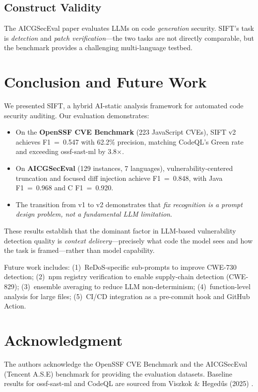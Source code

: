 \documentclass[conference]{IEEEtran}
\begin{document}
\subsection{Construct Validity}
The AICGSecEval paper evaluates LLMs on code \textit{generation} security. SIFT's task is \textit{detection} and \textit{patch verification}---the two tasks are not directly comparable, but the benchmark provides a challenging multi-language testbed.

\section{Conclusion and Future Work}

We presented SIFT, a hybrid AI-static analysis framework for automated code security auditing. Our evaluation demonstrates:

\begin{itemize}
\item On the \textbf{OpenSSF CVE Benchmark} (223 JavaScript CVEs), SIFT v2 achieves F1~=~0.547 with 62.2\% precision, matching CodeQL's Green rate and exceeding ossf-sast-ml by 3.8$\times$.
\item On \textbf{AICGSecEval} (129 instances, 7 languages), vulnerability-centered truncation and focused diff injection achieve F1~=~0.848, with Java F1~=~0.968 and C F1~=~0.920.
\item The transition from v1 to v2 demonstrates that \textit{fix recognition is a prompt design problem, not a fundamental LLM limitation}.
\end{itemize}

These results establish that the dominant factor in LLM-based vulnerability detection quality is \textit{context delivery}---precisely what code the model sees and how the task is framed---rather than model capability.

Future work includes: (1)~ReDoS-specific sub-prompts to improve CWE-730 detection; (2)~npm registry verification to enable supply-chain detection (CWE-829); (3)~ensemble averaging to reduce LLM non-determinism; (4)~function-level analysis for large files; (5)~CI/CD integration as a pre-commit hook and GitHub Action.

\section*{Acknowledgment}

The authors acknowledge the OpenSSF CVE Benchmark \cite{b18} and the AICGSecEval (Tencent A.S.E) benchmark \cite{b19} for providing the evaluation datasets. Baseline results for ossf-sast-ml and CodeQL are sourced from Viszkok \& Heged\H{u}s (2025) \cite{b5}.
\end{document}
